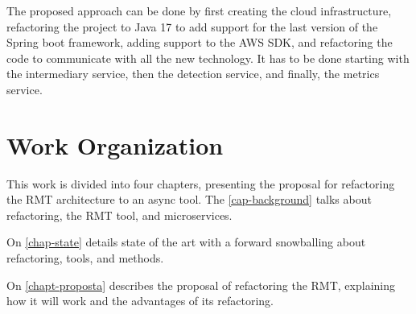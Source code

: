 The proposed approach can be done by first creating the cloud infrastructure, refactoring the project to Java 17 to add support for the last version of the Spring boot framework, adding support to the AWS SDK, and refactoring the code to communicate with all the new technology. It has to be done starting with the intermediary service, then the detection service, and finally, the metrics service.
\section{Work Organization}

This work is divided into four chapters, presenting the proposal for refactoring the RMT architecture to an async tool. The \cref{cap-background} talks about refactoring, the RMT tool, and microservices.

On \cref{chap-state} details state of the art with a forward snowballing about refactoring, tools, and methods.

On \cref{chapt-proposta} describes the proposal of refactoring the RMT, explaining how it will work and the advantages of its refactoring.